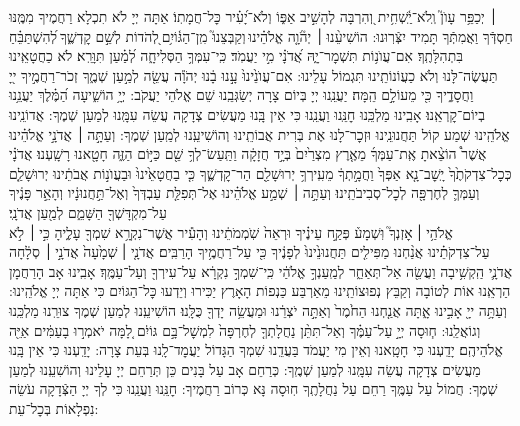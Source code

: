 \documentclass[twoside, openany, parskip=half, 11pt]{book}
\begin{document}
׀ יְכַפֵּ֥ר עָוֺן֮ וְֽלֹא־יַֽ֫שְׁחִ֥ית וְ֭הִרְבָּה לְהָשִׁ֣יב אַפּ֑וֹ וְלֹא־יָ֝עִ֗יר כׇּל־חֲמָתֽוֹ׃  אַתָּה יְיָ לֹא תִכְלָא רַחֲמֶיךָ מִמֶּֽנּוּ חַסְדְּֿךָ וַאֲמִתְּֿךָ תָּמִיד יִצְּֿרֽוּנוּ: הוֹשִׁיעֵ֨נוּ ׀ יְהֹ֘וָ֤ה אֱלֹהֵ֗ינוּ וְקַבְּצֵנוּ֮ מִֽן־הַגּ֫וֹיִ֥ם לְ֭הֹדוֹת לְשֵׁ֣ם קׇדְשֶׁ֑ךָ לְ֝הִשְׁתַּבֵּ֗חַ בִּתְהִלָּתֶֽךָ׃ 
אִם־עֲוֺנ֥וֹת תִּשְׁמׇר־יָ֑הּ אֲ֝דֹנָ֗י מִ֣י יַעֲמֹֽד׃  כִּֽי־עִמְּךָ֥ הַסְּלִיחָ֑ה לְ֝מַ֗עַן תִּוָּרֵֽא׃  לֹא כַחֲטָאֵֽינוּ תַּעֲשֶׂה־לָּנוּ וְלֹא כַעֲוֹנוֹתֵֽינוּ תִּגְמוֹל עָלֵינוּ:
אִם־עֲוֺנֵ֙ינוּ֙ עָ֣נוּ בָ֔נוּ יְהֹוָ֕ה עֲשֵׂ֖ה לְמַ֣עַן שְׁמֶ֑ךָ זְכֹר־רַחֲמֶ֣יךָ ייָ֭ וַחֲסָדֶ֑יךָ כִּ֖י מֵעוֹלָ֣ם הֵֽמָּה׃ יַעֲנֵֽנוּ יְיָ בְּיוֹם צָרָה יְשַׂגְּבֵֽנוּ שֵׁם אֱלֹהֵי יַעֲקֹב:
יְיָ֥  הוֹשִׁ֑יעָה הַ֝מֶּ֗לֶךְ יַעֲנֵ֥נוּ בְיוֹם־קׇרְאֵֽנוּ׃ 
אָבִֽינוּ מַלְכֵּֽנוּ חׇנֵּֽנוּ וַעֲנֵֽנוּ כִּי אֵין בָּֽנוּ מַעֲשִׂים צְדָקָה עֲשֵׂה עִמָּֽנוּ לְמַעַן שְׁמֶךָ:
אֲדוֹנֵֽינוּ אֱלֹהֵֽינוּ שְׁמַע קוֹל תַּחֲנוּנֵֽינוּ וּזְכׇר־לָנוּ אֶת בְּרִית אֲבוֹתֵֽינוּ וְהוֹשִׁיעֵֽנוּ לְמַֽעַן שְׁמֶךָ:
וְעַתָּ֣ה ׀ אֲדֹנָ֣י אֱלֹהֵ֗ינוּ אֲשֶׁר֩ הוֹצֵ֨אתָ אֶֽת־עַמְּךָ֜ מֵאֶ֤רֶץ מִצְרַ֙יִם֙ בְּיָ֣ד חֲזָקָ֔ה וַתַּֽעַשׂ־לְךָ֥ שֵׁ֖ם כַּיּ֣וֹם הַזֶּ֑ה חָטָ֖אנוּ רָשָֽׁעְנוּ׃ אֲדֹנָ֗י כְּכׇל־צִדְקֹתֶ֙ךָ֙ יָֽשׇׁב־נָ֤א אַפְּךָ֙ וַחֲמָ֣תְךָ֔ מֵעִֽירְךָ֥ יְרוּשָׁלַ֖‍ִם הַר־קׇדְשֶׁ֑ךָ כִּ֤י בַחֲטָאֵ֙ינוּ֙ וּבַעֲוֺנ֣וֹת אֲבֹתֵ֔ינוּ יְרוּשָׁלַ֧‍ִם וְעַמְּךָ֛ לְחֶרְפָּ֖ה לְכׇל־סְבִיבֹתֵֽינוּ׃ וְעַתָּ֣ה ׀ שְׁמַ֣ע אֱלֹהֵ֗ינוּ אֶל־תְּפִלַּ֤ת עַבְדְּךָ֙ וְאֶל־תַּ֣חֲנוּנָ֔יו וְהָאֵ֣ר פָּנֶ֔יךָ עַל־מִקְדָּשְׁךָ֖ הַשָּׁמֵ֑ם לְמַ֖עַן אֲדֹנָֽי׃\\
אֱלֹהַ֥י ׀ אׇזְנְךָ֮ וּֽשְׁמָע֒ פְּקַ֣ח עֵינֶ֗יךָ וּרְאֵה֙ שֹֽׁמְמֹתֵ֔ינוּ וְהָעִ֕יר אֲשֶׁר־נִקְרָ֥א שִׁמְךָ֖ עָלֶ֑יהָ כִּ֣י ׀ לֹ֣א עַל־צִדְקֹתֵ֗ינוּ אֲנַ֨חְנוּ מַפִּילִ֤ים תַּחֲנוּנֵ֙ינוּ֙ לְפָנֶ֔יךָ כִּ֖י עַל־רַחֲמֶ֥יךָ הָרַבִּֽים׃ אֲדֹנָ֤י ׀ שְׁמָ֙עָה֙ אֲדֹנָ֣י ׀ סְלָ֔חָה אֲדֹנָ֛י הַֽקְשִׁ֥יבָה וַעֲשֵׂ֖ה אַל־תְּאַחַ֑ר לְמַֽעַנְךָ֣ אֱלֹהַ֔י כִּֽי־שִׁמְךָ֣ נִקְרָ֔א עַל־עִירְךָ֖ וְעַל־עַמֶּֽךָ׃ אָבִֽינוּ אָב הָרַחֲמָן הַרְאֵֽנוּ אוֹת לְטוֹבָה וְקַבֵּץ נְפוּצוֹתֵֽינוּ מֵאַרְבַּע כַּנְפוֹת הָאָרֶץ יַכִּירוּ וְיֵדְעוּ כׇּל־הַגּוֹיִם כִּי אַתָּה יְיָ אֱלֹהֵֽינוּ: 
וְעַתָּ֥ה ייָ֖ אָבִ֣ינוּ אָ֑תָּה אֲנַ֤חְנוּ הַחֹ֙מֶר֙ וְאַתָּ֣ה יֹצְרֵ֔נוּ וּמַעֲשֵׂ֥ה יָדְךָ֖ כֻּלָּֽנוּ׃ הוֹשִׁיעֵֽנוּ לְמַעַן שְׁמֶךָ צוּרֵֽנוּ מַלְכֵּֽנוּ וְגוֹאֲלֵֽנוּ:
ח֧וּסָה יְיָ֣ עַל־עַמֶּ֗ךָ וְאַל־תִּתֵּ֨ן נַחֲלָתְךָ֤ לְחֶרְפָּה֙ לִמְשׇׁל־בָּ֣ם גּוֹיִ֔ם לָ֚מָּה יֹאמְר֣וּ בָעַמִּ֔ים אַיֵּ֖ה אֱלֹהֵיהֶֽם׃ יָדַֽעְנוּ כִּי חָטָֽאנוּ וְאֵין מִי יַעֲמֹד בַּעֲדֵֽנוּ שִׁמְךָ הַגָּדוֹל יַעֲמׇד־לָֽנוּ בְּעֵת צָרָה: יָדַֽעְנוּ כִּי אֵין בָּֽנוּ מַעֲשִׂים צְדָקָה עֲשֵׂה עִמָּֽנוּ לְמַעַן שְׁמֶֽךָ: כְּרַחֵם אָב עַל בָּנִים כֵּן תְּרַחֵם יְיָ עָלֵינוּ וְהוֹשִׁעֵֽנוּ לְמַעַן שְׁמֶךָ: חֲמוֹל עַל עַמֶּֽךָ רַחֵם עַל נַחֲלָתֶֽךָ חֽוּסָה נָּא כְּרוֹב רַחֲמֶיךָ: חׇנֵּֽנוּ וַעֲנֵֽנוּ כִּי לְךָ יְיָ הַצְּֿדָקָה עֹשֵׂה נִפְלָאוֹת בְּכׇל־עֵת:\\
\end{document}
